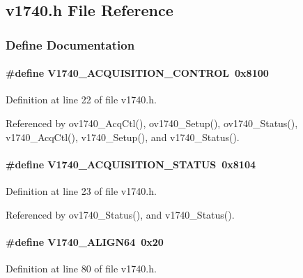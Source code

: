 \subsection{v1740.h File Reference}
\label{v1740_8h}


\subsubsection{Define Documentation}
\paragraph[{V1740\_\-ACQUISITION\_\-CONTROL}]{\setlength{\rightskip}{0pt plus 5cm}\#define V1740\_\-ACQUISITION\_\-CONTROL~0x8100}\hfill\label{v1740_8h_a0379eeb683fbe85087dc29cf23c6f322}


Definition at line 22 of file v1740.h.

Referenced by ov1740\_\-AcqCtl(), ov1740\_\-Setup(), ov1740\_\-Status(), v1740\_\-AcqCtl(), v1740\_\-Setup(), and v1740\_\-Status().
\paragraph[{V1740\_\-ACQUISITION\_\-STATUS}]{\setlength{\rightskip}{0pt plus 5cm}\#define V1740\_\-ACQUISITION\_\-STATUS~0x8104}\hfill\label{v1740_8h_af75f28f709929fefe0837f1d7df9d0c0}


Definition at line 23 of file v1740.h.

Referenced by ov1740\_\-Status(), and v1740\_\-Status().
\paragraph[{V1740\_\-ALIGN64}]{\setlength{\rightskip}{0pt plus 5cm}\#define V1740\_\-ALIGN64~0x20}\hfill\label{v1740_8h_ad077748537a3f8eed617164971dfb3e9}


Definition at line 80 of file v1740.h.
